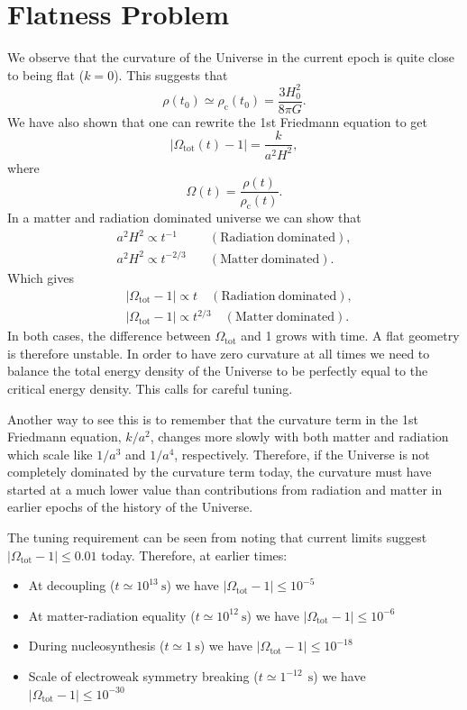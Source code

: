 \documentclass[a4paper,12pt]{article}
\theoremstyle{remark}
\newcommand{\mrm}[1]{\mathrm{#1}}
\renewcommand{\=}[1]{\stackrel{#1}{=}} %
\theoremstyle{plain}
\theoremstyle{definition}
\begin{document}
\section{Flatness Problem}
We observe that the curvature of the Universe in the current epoch is quite close to being flat ($k=0$). This suggests that 
\begin{equation}
\rho (t_0) \simeq \rho _\mrm{c}(t_0) = \frac{3H_0^{2}}{8\pi G}.
\end{equation}
We have also shown that one can rewrite the 1st Friedmann equation to get 
\begin{equation}
| \Omega _\mrm{tot}(t) - 1| = \frac{k}{a^{2}H^{2}},
\end{equation}
where 
\begin{equation}
\Omega (t) = \frac{\rho (t)}{\rho _\mrm{c}(t)}.
\end{equation}
In a matter and radiation dominated universe we can show that 
\begin{align}
a^{2} H^{2} \propto t^{-1} \quad &\mrm{(Radiation\: dominated)}, \\
a^{2} H^{2} \propto t^{-2/3} \quad &\mrm{(Matter\: dominated)}.
\end{align}
Which gives 
\begin{align}
&| \Omega _\mrm{tot} - 1| \propto t \quad \mrm{(Radiation\: dominated)}, \\
&| \Omega _\mrm{tot} - 1| \propto t^{2/3}  \quad \mrm{(Matter\: dominated)}.
\end{align}
In both cases, the difference between $\Omega _\mrm{tot}$ and 1 grows with time. A flat geometry is therefore unstable. In order to have zero curvature at all times we need to balance the total energy density of the Universe to be perfectly equal to the critical energy density. This calls for careful tuning.

Another way to see this is to remember that the curvature term in the 1st Friedmann equation, $k/a^{2}$, changes more slowly with both matter and radiation which scale like $1/a^{3}$ and $1/a^{4}$, respectively. Therefore, if the Universe is not completely dominated by the curvature term today, the curvature must have started at a much lower value than contributions from radiation and matter in earlier epochs of the history of the Universe.

The tuning requirement can be seen from noting that current limits suggest $|\Omega _\mrm{tot} - 1| \leq 0.01$ today. Therefore, at earlier times:
\vspace{-5mm}
\begin{itemize}
\item At decoupling ($t \simeq 10^{13} \:\mrm{s}$) we have $|\Omega _\mrm{tot} - 1| \leq 10^{-5}$
\item At matter-radiation equality ($t \simeq 10^{12} \:\mrm{s}$) we have $|\Omega _\mrm{tot} - 1| \leq 10^{-6}$
\item During nucleosynthesis ($t \simeq 1 \:\mrm{s}$) we have $|\Omega _\mrm{tot} - 1| \leq 10^{-18}$
\item Scale of electroweak symmetry breaking ($t \simeq 1^{-12} \:\: \mrm{s}$) we have $|\Omega _\mrm{tot} - 1| \leq 10^{-30}$
\end{itemize}
\end{document}
